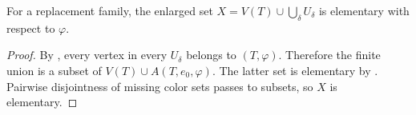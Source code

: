 \begin{lemma}
For a replacement family, the enlarged set
$X=V(T)\cup\bigcup_\delta U_\delta$ is elementary with respect to
$\varphi$.
\end{lemma}
\begin{proof}
By , every vertex in every
$U_\delta$ belongs to $(T,\varphi)$.  Therefore
the finite union  is a subset of
$V(T)\cup A(T,e_0,\varphi)$.  The latter set is elementary by
.  Pairwise disjointness of missing
color sets passes to subsets, so $X$ is elementary.
\end{proof}
